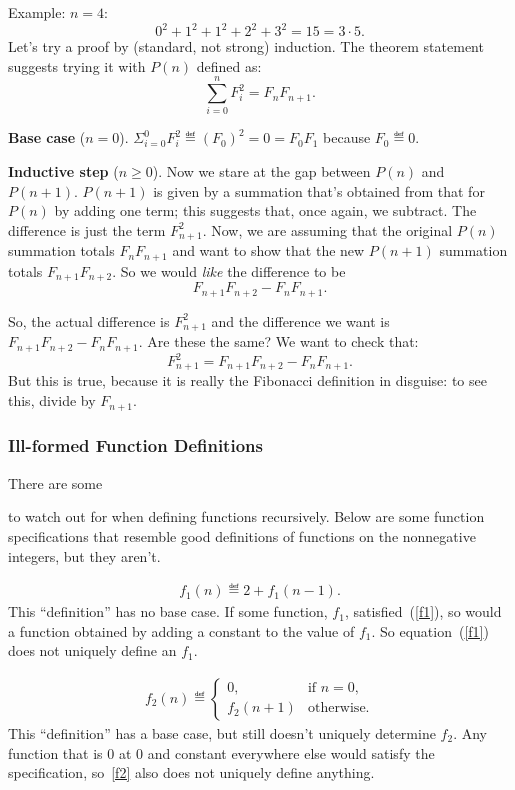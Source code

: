 \begin{definition}
\begin{staffnotes}
Example: $n = 4$:
\[
0^2 + 1^2 + 1^2 + 2^2 + 3^2 = 15 = 3 \cdot 5.
\]
Let's try a proof by (standard, not strong) induction.  The theorem
statement suggests trying it with $P(n)$ defined as:
\[
\sum_{i=0}^n F_i^2 = F_n F_{n+1}.
\]

\textbf{Base case} ($n=0$). 
$\Sigma_{i=0}^0 F_i^2 \eqdef (F_0)^2 = 0 = F_0 F_1$ because
$F_0 \eqdef 0$.

\textbf{Inductive step} ($n\geq 0$).  Now we stare at the gap between
$P(n)$ and $P(n+1)$.  $P(n+1)$ is given by a summation that's obtained
from that for $P(n)$ by adding one term; this suggests that, once again,
we subtract.  The difference is just the term $F_{n+1}^2$.  Now, we are
assuming that the original $P(n)$ summation totals $F_n F_{n+1}$ and want
to show that the new $P(n+1)$ summation totals $F_{n+1} F_{n+2}$.  So we
would {\em like\/} the difference to be
\[
F_{n+1} F_{n+2} - F_n F_{n+1}.
\]

So, the actual difference is $F_{n+1}^2$ and the difference we want is
$F_{n+1} F_{n+2} - F_n F_{n+1}$.  Are these the same?  We want to check
that:
\[
F_{n+1}^2 = F_{n+1} F_{n+2} - F_n F_{n+1}.
\]
But this is true, because it is really the Fibonacci definition in
disguise: to see this, divide by $F_{n+1}$.

\end{staffnotes}

\subsubsection{Ill-formed Function Definitions}

There are some  to watch out for when
defining functions recursively.  Below are some function specifications
that resemble good definitions of functions on the nonnegative integers,
but they aren't.

\begin{eqnarray}\label{f1}
f_1(n)\eqdef 2+f_1(n-1).
\end{eqnarray}
This ``definition'' has no base case.  If some function, $f_1$,
satisfied~(\ref{f1}), so would a function obtained by adding a constant to
the value of $f_1$.  So equation~(\ref{f1}) does not uniquely define
an $f_1$.

\begin{eqnarray}\label{f2}
f_2(n) \eqdef
\begin{cases}
 0, & \text{if $n=0$},\\
 f_2(n+1) &  \text{otherwise}.
\end{cases}
\end{eqnarray}
This ``definition'' has a base case, but still doesn't uniquely determine
$f_2$.  Any function that is 0 at 0 and constant everywhere else would
satisfy the specification, so~\eqref{f2} also does not uniquely define
anything.


\end{definition}
